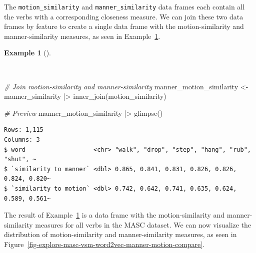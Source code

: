 \documentclass[
  letterpaper,
]{book}
\newenvironment{Shaded}{\begin{snugshade}}{\end{snugshade}}
\newcommand{\CommentTok}[1]{\textcolor[rgb]{0.00,0.00,0.00}{\textit{#1}}}
\newcommand{\FunctionTok}[1]{\textcolor[rgb]{0.00,0.00,0.00}{#1}}
\newcommand{\NormalTok}[1]{\textcolor[rgb]{0.00,0.00,0.00}{#1}}
\newcommand{\OtherTok}[1]{\textcolor[rgb]{0.00,0.00,0.00}{#1}}
\newcommand{\SpecialCharTok}[1]{\textcolor[rgb]{0.00,0.00,0.00}{#1}}
\theoremstyle{definition}
\newtheorem{example}{Example}[chapter]
\theoremstyle{remark}
\begin{document}
The \texttt{motion\_similarity} and \texttt{manner\_similarity} data
frames each contain all the verbs with a corresponding closeness
measure. We can join these two data frames by feature to create a single
data frame with the motion-similarity and manner-similarity measures, as
seen in Example~\ref{exm-explore-masc-vsm-word2vec-manner-motion}.

\begin{example}[]\protect\hypertarget{exm-explore-masc-vsm-word2vec-manner-motion}{}\label{exm-explore-masc-vsm-word2vec-manner-motion}

~

\begin{Shaded}
\begin{Highlighting}[]
\CommentTok{\# Join motion{-}similarity and manner{-}similarity}
\NormalTok{manner\_motion\_similarity }\OtherTok{\textless{}{-}}
\NormalTok{  manner\_similarity }\SpecialCharTok{|\textgreater{}}
  \FunctionTok{inner\_join}\NormalTok{(motion\_similarity)}

\CommentTok{\# Preview}
\NormalTok{manner\_motion\_similarity }\SpecialCharTok{|\textgreater{}} \FunctionTok{glimpse}\NormalTok{()}
\end{Highlighting}
\end{Shaded}

\begin{verbatim}
Rows: 1,115
Columns: 3
$ word                   <chr> "walk", "drop", "step", "hang", "rub", "shut", ~
$ `similarity to manner` <dbl> 0.865, 0.841, 0.831, 0.826, 0.826, 0.824, 0.820~
$ `similarity to motion` <dbl> 0.742, 0.642, 0.741, 0.635, 0.624, 0.589, 0.561~
\end{verbatim}

\end{example}

The result of Example~\ref{exm-explore-masc-vsm-word2vec-manner-motion}
is a data frame with the motion-similarity and manner-similarity
measures for all verbs in the MASC dataset. We can now visualize the
distribution of motion-similarity and manner-similarity measures, as
seen in
Figure~\ref{fig-explore-masc-vsm-word2vec-manner-motion-compare}.
\end{document}
